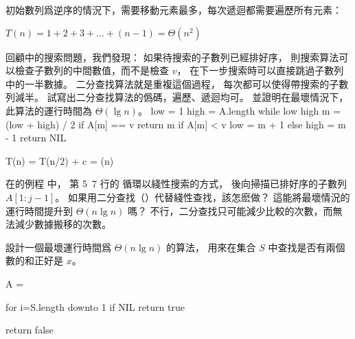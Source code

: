 初始數列爲逆序的情況下，需要移動元素最多，每次遞迴都需要遍歷所有元素：

$T(n) = 1 + 2 + 3 + ... + (n-1) = \Theta(n^2)$
\stopANSWER

回顧 中的搜索問題，我們發現：
如果待搜索的子數列已經排好序，
則搜索算法可以檢查子數列的中間數值，而不是檢查 $v$，
在下一步搜索時可以直接跳過子數列中的一半數據。
二分查找算法就是重複這個過程，
每次都可以使得帶搜索的子數列減半。
試寫出二分查找算法的僞碼，遍歷、遞迴均可。
並證明在最壞情況下，此算法的運行時間為 $\Theta(\lg n)$。
\stopEXERCISE
\startANSWER
{}
\startCLRSCODE
low = 1
high = A.length
while low \le high
	m = (low + high) / 2
	if A[m] == v
		return m
	if A[m] < v
		low = m + 1
	else
		high = m - 1
return NIL
\stopCLRSCODE

\startformula
T(n) = T(n/2) + c = \Theta(\lg n)
\stopformula
\stopANSWER

\startEXERCISE
在 的例程  中，
第 5~7 行的  循環以綫性搜索的方式，
後向掃描已排好序的子數列 $A[1:j-1]$。
如果用二分查找（）代替綫性查找，該怎麽做？
這能將最壞情況的運行時間提升到 $\Theta(n\lg n)$ 嗎？
\stopEXERCISE
\startANSWER
不行，二分查找只可能減少比較的次數，而無法減少數據搬移的次數。
\stopANSWER

\startEXERCISE
設計一個最壞運行時間爲 $\Theta(n\lg n)$ 的算法，
用來在集合 $S$ 中查找是否有兩個數的和正好是 $x$。
\stopEXERCISE

\startANSWER
{}
\startCLRSCODE
A = 

for i=S.length downto 1
	if  \ne NIL
		return true

return false
\stopCLRSCODE
\stopANSWER

\stopsection
